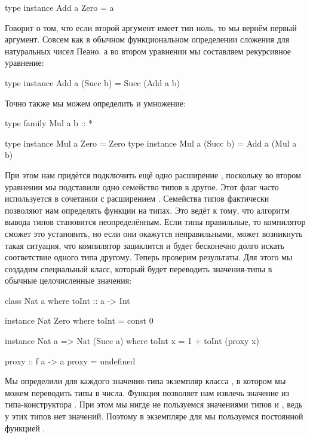 \begin{code}
type instance Add a Zero        = a
\end{code}

Говорит о том, что если второй аргумент имеет
тип ноль, то мы вернём первый аргумент. Совсем как в обычном
функциональном определении сложения для натуральных чисел
Пеано. а во втором уравнении мы составляем рекурсивное 
уравнение:

\begin{code}
type instance Add a (Succ b)    = Succ (Add a b)
\end{code}

Точно также мы можем определить и умножение:

\begin{code}
type family Mul a b :: *

type instance Mul a Zero        = Zero
type instance Mul a (Succ b)    = Add a (Mul a b)
\end{code}

При этом нам придётся подключить ещё одно расширение
, поскольку во втором уравнении
мы подставили одно семейство типов в другое. Этот флаг часто
используется в сочетании с расширением . 
Семейства типов фактически позволяют нам определять 
функции на типах. Это ведёт к тому, что алгоритм вывода
типов становится неопределённым. Если типы правильные,
то компилятор сможет это установить, но если они окажутся 
неправильными, может возникнуть такая ситуация, что компилятор
зациклится и будет бесконечно долго искать соответствие
одного типа другому. Теперь проверим результаты. Для этого 
мы создадим специальный класс, который будет переводить 
значения-типы в обычные целочисленные значения:


\begin{code}
class Nat a where
    toInt :: a -> Int

instance Nat Zero where
    toInt = const 0

instance Nat a => Nat (Succ a) where
    toInt x = 1 + toInt (proxy x)
        
proxy :: f a -> a
proxy = undefined
\end{code}

Мы определили для каждого значения-типа экземпляр
класса , в котором мы можем переводить типы в числа.
Функция  позволяет нам извлечь значение из
типа-конструктора . При этом мы нигде не пользуемся
значениями типов  и , ведь у этих типов 
нет значений. Поэтому в экземпляре для  мы пользуемся
постоянной функцией .

